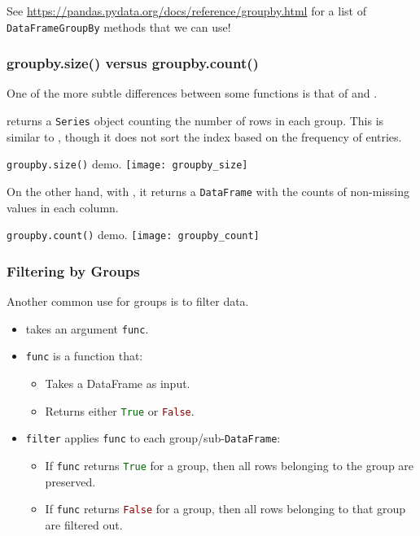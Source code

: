 \documentclass[openany]{book}
\begin{document}
See \url{https://pandas.pydata.org/docs/reference/groupby.html} for a list of \texttt{DataFrameGroupBy} methods that we can use!


\subsubsection{groupby.size() versus groupby.count()}
One of the more subtle differences between some functions is that of  and .

 returns a \texttt{Series} object counting the number of rows in each group. This is similar to , though it does not sort the index based on the frequency of entries.

\begin{figurebox}[]{\texttt{groupby.size()} demo.}
	\centering\texttt{[image: groupby\_size]}
\end{figurebox}

On the other hand, with , it returns a \texttt{DataFrame} with the counts of non-missing values in each column.

\begin{figurebox}[]{\texttt{groupby.count()} demo.}
	\centering\texttt{[image: groupby\_count]}
\end{figurebox}

\subsubsection{Filtering by Groups}
Another common use for groups is to filter data.
\begin{itemize}
	\item {} takes an argument \texttt{func}.
	\item \texttt{func} is a function that:
	\begin{itemize}
		\item Takes a DataFrame as input.
		\item Returns either \textcolor{darkgreen}{\texttt{True}} or \textcolor{darkred}{\texttt{False}}.
	\end{itemize}
	\item \texttt{filter} applies \texttt{func} to each group/sub-\texttt{DataFrame}:
	\begin{itemize}
		\item If \texttt{func} returns \textcolor{darkgreen}{\texttt{True}} for a group, then all rows belonging to the group are preserved.
		\item If \texttt{func} returns \textcolor{darkred}{\texttt{False}} for a group, then all rows belonging to that group are filtered out.
	\end{itemize}
\end{itemize}
\end{document}
